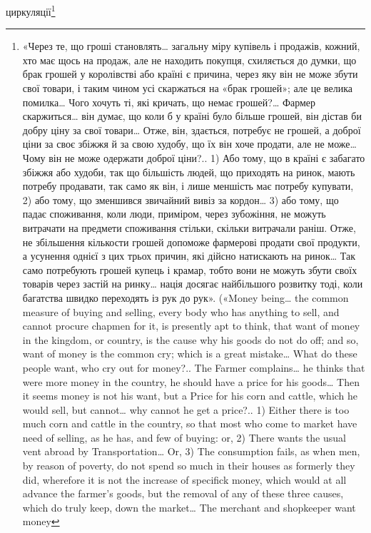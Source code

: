 циркуляції\footnote{
«Через те, що гроші становлять\dots{} загальну міру купівель і продажів,
кожний, хто має щось на продаж, але не находить покупця, схиляється
до думки, що брак грошей у королівстві або країні є причина,
через яку він не може збути свої товари, і таким чином усі скаржаться на
«брак грошей»; але це велика помилка\dots{} Чого хочуть ті, які кричать,
що немає грошей?\dots{} Фармер скаржиться\dots{} він думає, що коли б у країні
було більше грошей, він дістав би добру ціну за свої товари\dots{} Отже, він,
здається, потребує не грошей, а доброї ціни за своє збіжжя й за свою худобу,
що їх він хоче продати, але не може\dots{} Чому він не може одержати
доброї ціни?.. 1) Або тому, що в країні є забагато збіжжя або худоби,
так що більшість людей, що приходять на ринок, мають потребу продавати,
так само як він, і лише меншість має потребу купувати, 2) або
тому, що зменшився звичайний вивіз за кордон\dots{} 3) або тому, що падає
споживання, коли люди, приміром, через зубожіння, не можуть витрачати
на предмети споживання стільки, скільки витрачали раніш. Отже,
не збільшення кількости грошей допоможе фармерові продати свої продукти,
а усунення однієї з цих трьох причин, які дійсно натискають на
ринок\dots{} Так само потребують грошей купець і крамар, тобто вони не можуть
збути своїх товарів через застій на ринку\dots{} нація досягає найбільшого
розвитку тоді, коли багатства швидко переходять із рук до рук».
(«Money being\dots{} the common measure of buying and selling, every body
who has anything to sell, and cannot procure chapmen for it, is presently
apt to think, that want of money in the kingdom, or country, is the cause
why his goods do not do off; and so, want of money is the common cry;
which is a great mistake\dots{} What do these people want, who cry out for
money?.. The Farmer complains\dots{} he thinks that were more money in the
country, he should have a price for his goods\dots{} Then it seems money is not
his want, but a Price for his corn and cattle, which he would sell, but cannot\dots{}
why cannot he get a price?.. 1) Either there is too much corn and cattle
in the country, so that most who come to market have need of selling,
as he has, and few of buying: or, 2) There wants the usual vent abroad by
Transportation\dots{} Or, 3) The consumption fails, as when men, by reason of
poverty, do not spend so much in their houses as formerly they did, wherefore
it is not the increase of specifick money, which would at all advance
the farmer’s goods, but the removal of any of these three causes, which
do truly keep, down the market\dots{} The merchant and shopkeeper want money
}
